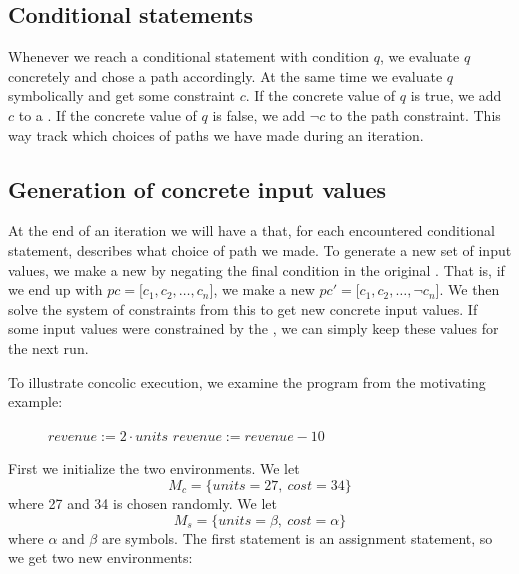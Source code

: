 	\subsection{Conditional statements}
	
	Whenever we reach a conditional statement with condition $q$, we evaluate $q$ concretely and chose a path accordingly. At the same time we evaluate $q$ symbolically and get some constraint $c$. If the concrete value of $q$ is true, we add $c$ to a \pc. If the concrete value of $q$ is false, we add $\neg c$ to the path constraint. This way track which choices of paths we have made during an iteration. 
	
	\subsection{Generation of concrete input values}
	
	At the end of an iteration we will have a \pc that, for each encountered conditional statement, describes what choice of path we made. To generate a new set of input values, we make a new \pc by negating the final condition in the original \pc. That is, if we end up with $pc = \lbrack c_1, c_2, \ldots, c_n \rbrack$, we make a new \pc $pc' = \lbrack c_1, c_2, \ldots, \neg c_n \rbrack$. We then solve the system of constraints from this \pc to get new concrete input values. If some input values were constrained by the \pc, we can simply keep these values for the next run.

\bigskip
To illustrate concolic execution, we examine the program from the motivating example:


\begin{figure}[!h]
	\begin{algorithmic}[1]
		\State $revenue := 2\cdot units$
		\State $revenue := revenue - 10$
		\EndIf
		\State {}
		\EndProcedure
	\end{algorithmic}
\end{figure}

\motexample

\newpage

\noindent First we initialize the two environments. We let 
\begin{equation*}
	M_c = \{units = 27, \ cost = 34\}
\end{equation*}
 where 27 and 34 is chosen randomly. We let
\begin{equation*}
 	M_s = \{units =\beta, \ cost = \alpha\}
\end{equation*}
where $\alpha$ and $\beta$ are symbols. The first statement is an assignment statement, so we get two new environments:

